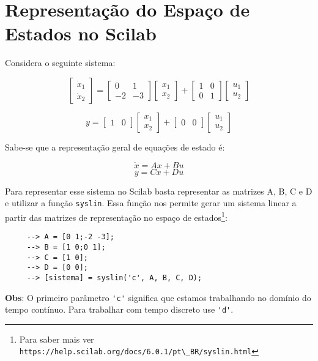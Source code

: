\section{Representação do Espaço de Estados no Scilab}
Considera o seguinte sistema:

$$
\begin{bmatrix}
\dot{x}_{1}\\\dot{x}_{2}
\end{bmatrix} = \begin{bmatrix}
0 & 1\\
-2 & -3
\end{bmatrix} \begin{bmatrix}
x_{1}\\x_{2}
\end{bmatrix}+\begin{bmatrix}
1 & 0\\
0 & 1
\end{bmatrix} \begin{bmatrix}
u_{1}\\u_{2}
\end{bmatrix}
$$

$$
y=\begin{bmatrix}
1 & 0
\end{bmatrix} \begin{bmatrix}
x_{1} \\ x_{2}
\end{bmatrix} + \begin{bmatrix}
0 & 0
\end{bmatrix} \begin{bmatrix}
u_{1} \\ u_{2}
\end{bmatrix}
$$

Sabe-se que a representação geral de equações de estado é:

$$\textbf{$\dot{x}$} = \textbf{$Ax$} + \textbf{$Bu$}$$
$$\textbf{$y$} = \textbf{$Cx$} + \textbf{$Du$}$$

Para representar esse sistema no Scilab basta representar as matrizes A, B, C e D e utilizar a função \verb|syslin|. Essa função nos permite gerar um sistema linear a partir das matrizes de representação no espaço de estados\footnote{Para saber mais ver \verb|https://help.scilab.org/docs/6.0.1/pt\_BR/syslin.html|}:

 \begin{verbatim}
     --> A = [0 1;-2 -3];
     --> B = [1 0;0 1];
     --> C = [1 0];
     --> D = [0 0];
     --> [sistema] = syslin('c', A, B, C, D);
 \end{verbatim}
\textbf{Obs}: O primeiro parâmetro \verb|'c'| significa que estamos trabalhando no domínio do tempo contínuo. Para trabalhar com tempo discreto use \verb|'d'|.

